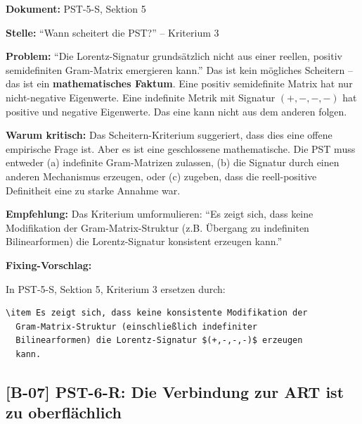 \documentclass[11pt,a4paper]{article}
\newcommand{\B}[1]{\textbf{[B-#1]}}
\newcommand{\Dok}[1]{\noindent\textbf{Dokument:} #1\par\smallskip}
\newcommand{\Stelle}[1]{\noindent\textbf{Stelle:} #1\par\smallskip}
\newcommand{\Prob}[1]{\noindent\textbf{Problem:} #1\par\smallskip}
\newcommand{\Krit}[1]{\noindent\textbf{Warum kritisch:} #1\par\smallskip}
\newcommand{\Empf}[1]{\noindent\textbf{Empfehlung:} #1\par\smallskip}
\newenvironment{Fix}
  {\par\medskip\noindent\textbf{Fixing-Vorschlag:}\par\nobreak\smallskip}
  {\par\medskip}
\begin{document}
\Dok{PST-5-S, Sektion 5}
\Stelle{``Wann scheitert die PST?'' -- Kriterium 3}
\Prob{``Die Lorentz-Signatur grundsätzlich nicht aus einer reellen,
positiv semidefiniten Gram-Matrix emergieren kann.'' Das ist kein
mögliches Scheitern -- das ist ein \textbf{mathematisches
Faktum}. Eine positiv semidefinite Matrix hat nur nicht-negative
Eigenwerte. Eine indefinite Metrik mit Signatur $(+,-,-,-)$ hat
positive und negative Eigenwerte. Das eine kann nicht aus dem
anderen folgen.}
\Krit{Das Scheitern-Kriterium suggeriert, dass dies eine offene
empirische Frage ist. Aber es ist eine geschlossene mathematische.
Die PST muss entweder (a) indefinite Gram-Matrizen zulassen, (b)
die Signatur durch einen anderen Mechanismus erzeugen, oder (c)
zugeben, dass die reell-positive Definitheit eine zu starke Annahme
war.}
\Empf{Das Kriterium umformulieren: ``Es zeigt sich, dass keine
Modifikation der Gram-Matrix-Struktur (z.B. Übergang zu indefiniten
Bilinearformen) die Lorentz-Signatur konsistent erzeugen kann.''}
\begin{Fix}
In PST-5-S, Sektion 5, Kriterium 3 ersetzen durch:
\begin{verbatim}
\item Es zeigt sich, dass keine konsistente Modifikation der
  Gram-Matrix-Struktur (einschließlich indefiniter
  Bilinearformen) die Lorentz-Signatur $(+,-,-,-)$ erzeugen
  kann.
\end{verbatim}
\end{Fix}

\subsection{\B{07} PST-6-R: Die Verbindung zur ART ist zu oberflächlich}
\end{document}
